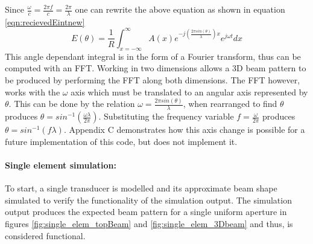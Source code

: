 Since $\frac{\omega}{c} = \frac{2\pi f}{c} = \frac{2\pi}{\lambda}$ one can rewrite the above equation as shown in equation \ref{eqn:recievedEintnew}
\begin{equation}\label{eqn:recievedEintnew}
    E(\theta) = \frac{1}{R}  \int_{x=-\infty}^\infty A(x) e^{-j(\frac{2\pi sin(\theta)}{\lambda})x}e^{j\omega t}dx
\end{equation}
This angle dependant integral is in the form of a Fourier transform, thus can be computed with an FFT. Working in two dimensions allows a 3D beam pattern to be produced by performing the FFT along both dimensions.
The FFT however, works with the $\omega$ axis which must be translated to an angular axis represented by $\theta$. This can be done by the relation $\omega = \frac{2\pi sin(\theta)}{\lambda}$, when rearranged to find $\theta$ produces $\theta = sin^{-1}(\frac{\omega \lambda}{2\pi})$. Substituting the frequency variable $f=\frac{\omega}{2\pi}$ produces $\theta = sin^{-1}(f\lambda)$. Appendix C demonstrates how this axis change is possible for a future implementation of this code, but does not implement it.\\

\paragraph{Single element simulation:}
To start, a single transducer is modelled and its approximate beam shape simulated to verify the functionality of the simulation output. The simulation output produces the expected beam pattern for a single uniform aperture in figures \ref{fig:single_elem_topBeam} and \ref{fig:single_elem_3Dbeam} and thus, is considered functional.

